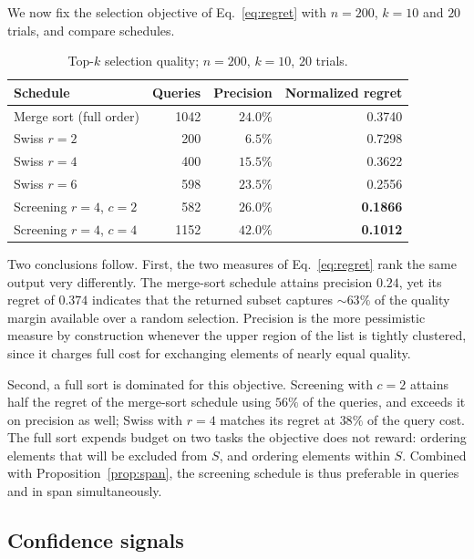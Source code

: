 \documentclass[11pt,a4paper]{article}
\begin{document}
We now fix the selection objective of Eq.~\eqref{eq:regret} with $n = 200$,
$k = 10$ and $20$ trials, and compare schedules.

\begin{table}[h]
\centering
\begin{tabular}{lrrr}
\toprule
Schedule & Queries & Precision & Normalized regret \\
\midrule
Merge sort (full order)     & 1042 & $24.0\%$ & 0.3740 \\
Swiss $r=2$                 &  200 & $6.5\%$  & 0.7298 \\
Swiss $r=4$                 &  400 & $15.5\%$ & 0.3622 \\
Swiss $r=6$                 &  598 & $23.5\%$ & 0.2556 \\
Screening $r=4$, $c=2$      &  582 & $26.0\%$ & \textbf{0.1866} \\
Screening $r=4$, $c=4$      & 1152 & $42.0\%$ & \textbf{0.1012} \\
\bottomrule
\end{tabular}
\caption{Top-$k$ selection quality; $n=200$, $k=10$, $20$ trials.}
\label{tab:topk}
\end{table}

Two conclusions follow. First, the two measures of Eq.~\eqref{eq:regret} rank the
same output very differently. The merge-sort schedule attains precision $0.24$,
yet its regret of $0.374$ indicates that the returned subset captures
${\sim}63\%$ of the quality margin available over a random selection. Precision
is the more pessimistic measure by construction whenever the upper region of the
list is tightly clustered, since it charges full cost for exchanging elements of
nearly equal quality.

Second, a full sort is dominated for this objective. Screening with $c = 2$
attains half the regret of the merge-sort schedule using $56\%$ of the queries,
and exceeds it on precision as well; Swiss with $r = 4$ matches its regret at
$38\%$ of the query cost. The full sort expends budget on two tasks the objective
does not reward: ordering elements that will be excluded from $S$, and ordering
elements within $S$. Combined with Proposition~\ref{prop:span}, the screening
schedule is thus preferable in queries and in span simultaneously.

\subsection{Confidence signals}
\label{sec:conf}
\end{document}
